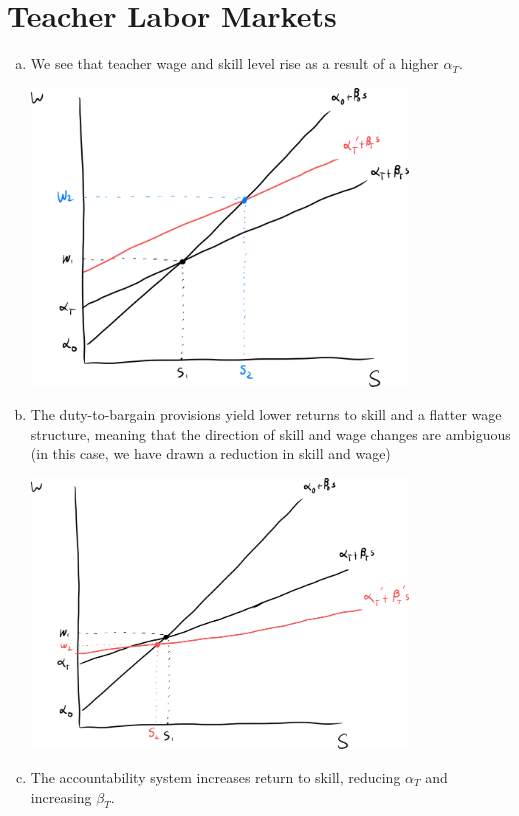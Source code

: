 \documentclass[10pt]{extarticle}
\begin{document}
  \section{Teacher Labor Markets}%
  \begin{enumerate}[(a)]
    \item We see that teacher wage and skill level rise as a result of a higher $\alpha_T$.
      \begin{center}
        \includegraphics[width=10cm]{images/ps3q3a.png}
      \end{center}
    \item The duty-to-bargain provisions yield lower returns to skill and a flatter wage structure, meaning that the direction of skill and wage changes are ambiguous (in this case, we have drawn a reduction in skill and wage)
      \begin{center}
        \includegraphics[width=10cm]{images/ps3q3b.png}
      \end{center}
    \item The accountability system increases return to skill, reducing $\alpha_T$ and increasing $\beta_T$.

\end{enumerate}
\end{document}
